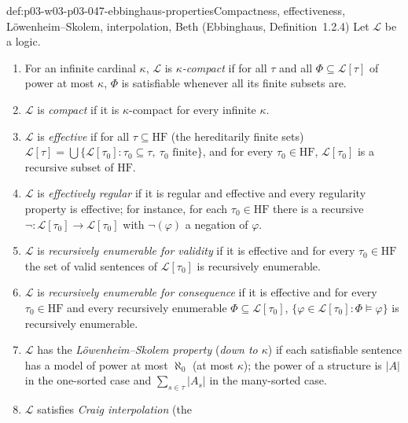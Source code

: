 \begin{hbdefinition}{def:p03-w03-p03-047-ebbinghaus-properties}{Compactness, effectiveness, L\"owenheim--Skolem, interpolation, Beth (Ebbinghaus, Definition~1.2.4)}
Let \(\mathscr L\) be a logic.
\begin{enumerate}
 \item[(i)] For an infinite cardinal \(\kappa\), \(\mathscr L\) is
       \emph{\(\kappa\)-compact} if for all \(\tau\) and all
       \(\Phi\subseteq\mathscr L[\tau]\) of power at most \(\kappa\),
       \(\Phi\) is satisfiable whenever all its finite subsets are.
 \item[(ii)] \(\mathscr L\) is \emph{compact} if it is \(\kappa\)-compact
       for every infinite \(\kappa\).
 \item[(iii)] \(\mathscr L\) is \emph{effective} if for all
       \(\tau\subseteq\mathrm{HF}\) (the hereditarily finite sets)
       \(\mathscr L[\tau]=\bigcup\{\mathscr L[\tau_0]:\tau_0\subseteq\tau,\ \tau_0\text{ finite}\}\),
       and for every \(\tau_0\in\mathrm{HF}\), \(\mathscr L[\tau_0]\) is a
       recursive subset of \(\mathrm{HF}\).
 \item[(iv)] \(\mathscr L\) is \emph{effectively regular} if it is regular
       and effective and every regularity property is effective; for
       instance, for each \(\tau_0\in\mathrm{HF}\) there is a recursive
       \(\neg:\mathscr L[\tau_0]\to\mathscr L[\tau_0]\) with
       \(\neg(\varphi)\) a negation of \(\varphi\).
 \item[(v)] \(\mathscr L\) is \emph{recursively enumerable for validity} if
       it is effective and for every \(\tau_0\in\mathrm{HF}\) the set of
       valid sentences of \(\mathscr L[\tau_0]\) is recursively enumerable.
 \item[(vi)] \(\mathscr L\) is \emph{recursively enumerable for
       consequence} if it is effective and for every \(\tau_0\in\mathrm{HF}\)
       and every recursively enumerable \(\Phi\subseteq\mathscr L[\tau_0]\),
       \(\{\varphi\in\mathscr L[\tau_0]:\Phi\models\varphi\}\) is
       recursively enumerable.
 \item[(vii)] \(\mathscr L\) has the \emph{L\"owenheim--Skolem property}
       (\emph{down to \(\kappa\)}) if each satisfiable sentence has a model
       of power at most \(\aleph_0\) (at most \(\kappa\)); the power of a
       structure is \(|A|\) in the one-sorted case and
       \(\sum_{s\in\tau}|A_s|\) in the many-sorted case.
 \item[(viii)] \(\mathscr L\) satisfies \emph{Craig interpolation} (the

\end{enumerate}
\end{hbdefinition}
